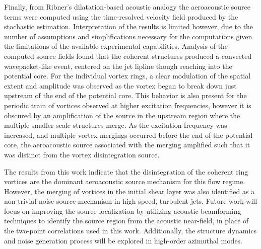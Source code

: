 Finally, from Ribner's dilatation-based acoustic analogy the aeroacoustic source terms were computed using the time-resolved velocity field produced by the stochastic estimation.
Interpretation of the results is limited however, due to the number of assumptions and simplifications necessary for the computations given the limitations of the available experimental capabilities.
Analysis of the computed source fields found that the coherent structures produced a convected wavepacket-like event, centered on the jet lipline though reaching into the potential core.
For the individual vortex rings, a clear modulation of the spatial extent and amplitude was observed as the vortex began to break down just upstream of the end of the potential core.
This behavior is also present for the periodic train of vortices observed at higher excitation frequencies, however it is obscured by an amplification of the source in the upstream region where the multiple smaller-scale structures merge.
As the excitation frequency was increased, and multiple vortex mergings occurred before the end of the potential core, the aeroacoustic source associated with the merging amplified such that it was distinct from the vortex disintegration source.

The results from this work indicate that the disintegration of the coherent ring vortices are the dominant aeroacoustic source mechanism for this flow regime. 
However, the merging of vortices in the initial shear layer was also identified as a non-trivial noise source mechanism in high-speed, turbulent jets. 
Future work will focus on improving the source localization by utilizing acoustic beamforming techniques to identify the source region from the acoustic near-field, in place of the two-point correlations used in this work.
Additionally, the structure dynamics and noise generation process will be explored in high-order azimuthal modes.